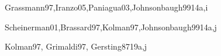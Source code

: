 \begin{syllabus}
   \begin{unit}{\DSBasicLogic}{}{Grassmann97,Iranzo05,Paniagua03,Johnsonbaugh99}{14}{a,i}
       \DSBasicLogicAllTopics
       \DSBasicLogicAllLearningOutcomes
   \end{unit}
   
   \begin{unit}{\DSProofTechniques}{}{Scheinerman01,Brassard97,Kolman97,Johnsonbaugh99}{14}{a,j}
      \DSProofTechniquesAllTopics
      \DSProofTechniquesAllLearningOutcomes
   \end{unit}
   
   \begin{unit}{\ARDigitallogicanddigitalsystems}{}{Kolman97, Grimaldi97, Gersting87}{19}{a,j}
      \ARDigitallogicanddigitalsystemsAllTopics
      \ARDigitallogicanddigitalsystemsAllLearningOutcomes
   \end{unit}
   
   \begin{coursebibliography}
   \end{coursebibliography}
   
   \end{syllabus}
   
   